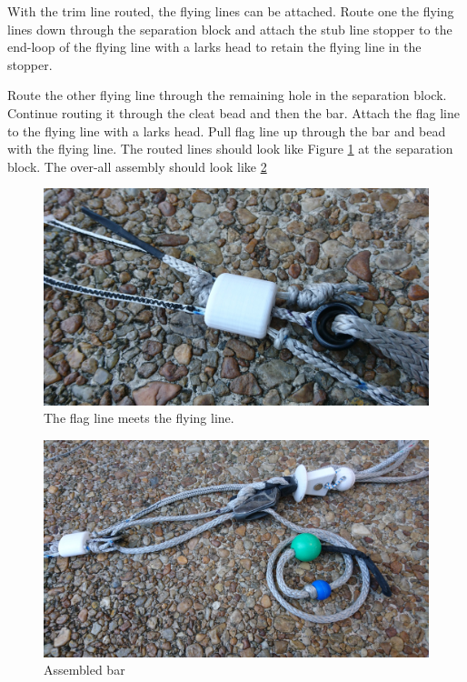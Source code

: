 \documentclass[]{book}
\begin{document}
With the trim line routed, the flying lines can be attached. Route one the flying lines down through the separation block and attach the stub line stopper to the end-loop of the flying line with a larks head to retain the flying line in the stopper.

Route the other flying line through the remaining hole in the separation block. Continue routing it through the cleat bead and then the bar. Attach the flag line to the flying line with a larks head. Pull flag line up through the bar and bead with the flying line. The routed lines should look like Figure \ref{fig:flag-line-at-separation-block} at the separation block. The over-all assembly should look like \ref{fig:upper-section-of-assembled-bar}

\begin{figure}

{\centering \includegraphics[width=0.7\linewidth]{images/flag-line-at-separation-block} 

}

\caption{The flag line meets the flying line.}\label{fig:flag-line-at-separation-block}
\end{figure}

\begin{figure}

{\centering \includegraphics[width=0.7\linewidth]{images/upper_section_of_assembled_bar} 

}

\caption{Assembled bar}\label{fig:upper-section-of-assembled-bar}
\end{figure}
\end{document}
